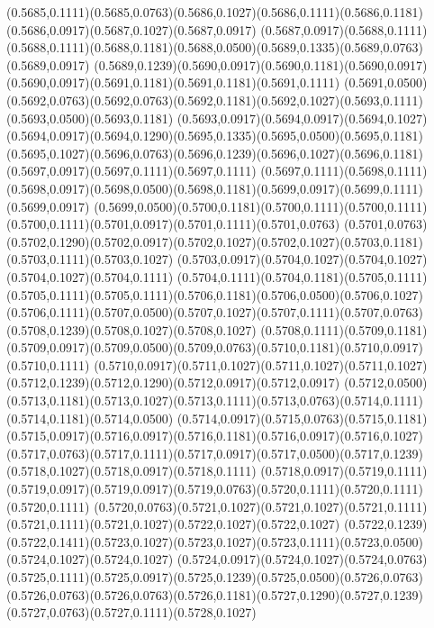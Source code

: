 (0.5685,0.1111)(0.5685,0.0763)(0.5686,0.1027)(0.5686,0.1111)(0.5686,0.1181)(0.5686,0.0917)(0.5687,0.1027)(0.5687,0.0917)
(0.5687,0.0917)(0.5688,0.1111)(0.5688,0.1111)(0.5688,0.1181)(0.5688,0.0500)(0.5689,0.1335)(0.5689,0.0763)(0.5689,0.0917)
(0.5689,0.1239)(0.5690,0.0917)(0.5690,0.1181)(0.5690,0.0917)(0.5690,0.0917)(0.5691,0.1181)(0.5691,0.1181)(0.5691,0.1111)
(0.5691,0.0500)(0.5692,0.0763)(0.5692,0.0763)(0.5692,0.1181)(0.5692,0.1027)(0.5693,0.1111)(0.5693,0.0500)(0.5693,0.1181)
(0.5693,0.0917)(0.5694,0.0917)(0.5694,0.1027)(0.5694,0.0917)(0.5694,0.1290)(0.5695,0.1335)(0.5695,0.0500)(0.5695,0.1181)
(0.5695,0.1027)(0.5696,0.0763)(0.5696,0.1239)(0.5696,0.1027)(0.5696,0.1181)(0.5697,0.0917)(0.5697,0.1111)(0.5697,0.1111)
(0.5697,0.1111)(0.5698,0.1111)(0.5698,0.0917)(0.5698,0.0500)(0.5698,0.1181)(0.5699,0.0917)(0.5699,0.1111)(0.5699,0.0917)
(0.5699,0.0500)(0.5700,0.1181)(0.5700,0.1111)(0.5700,0.1111)(0.5700,0.1111)(0.5701,0.0917)(0.5701,0.1111)(0.5701,0.0763)
(0.5701,0.0763)(0.5702,0.1290)(0.5702,0.0917)(0.5702,0.1027)(0.5702,0.1027)(0.5703,0.1181)(0.5703,0.1111)(0.5703,0.1027)
(0.5703,0.0917)(0.5704,0.1027)(0.5704,0.1027)(0.5704,0.1027)(0.5704,0.1111)
\PST@Solid(0.5704,0.1111)(0.5704,0.1181)(0.5705,0.1111)(0.5705,0.1111)(0.5705,0.1111)(0.5706,0.1181)(0.5706,0.0500)(0.5706,0.1027)
(0.5706,0.1111)(0.5707,0.0500)(0.5707,0.1027)(0.5707,0.1111)(0.5707,0.0763)(0.5708,0.1239)(0.5708,0.1027)(0.5708,0.1027)
(0.5708,0.1111)(0.5709,0.1181)(0.5709,0.0917)(0.5709,0.0500)(0.5709,0.0763)(0.5710,0.1181)(0.5710,0.0917)(0.5710,0.1111)
(0.5710,0.0917)(0.5711,0.1027)(0.5711,0.1027)(0.5711,0.1027)(0.5712,0.1239)(0.5712,0.1290)(0.5712,0.0917)(0.5712,0.0917)
(0.5712,0.0500)(0.5713,0.1181)(0.5713,0.1027)(0.5713,0.1111)(0.5713,0.0763)(0.5714,0.1111)(0.5714,0.1181)(0.5714,0.0500)
(0.5714,0.0917)(0.5715,0.0763)(0.5715,0.1181)(0.5715,0.0917)(0.5716,0.0917)(0.5716,0.1181)(0.5716,0.0917)(0.5716,0.1027)
(0.5717,0.0763)(0.5717,0.1111)(0.5717,0.0917)(0.5717,0.0500)(0.5717,0.1239)(0.5718,0.1027)(0.5718,0.0917)(0.5718,0.1111)
(0.5718,0.0917)(0.5719,0.1111)(0.5719,0.0917)(0.5719,0.0917)(0.5719,0.0763)(0.5720,0.1111)(0.5720,0.1111)(0.5720,0.1111)
(0.5720,0.0763)(0.5721,0.1027)(0.5721,0.1027)(0.5721,0.1111)(0.5721,0.1111)(0.5721,0.1027)(0.5722,0.1027)(0.5722,0.1027)
(0.5722,0.1239)(0.5722,0.1411)(0.5723,0.1027)(0.5723,0.1027)(0.5723,0.1111)(0.5723,0.0500)(0.5724,0.1027)(0.5724,0.1027)
(0.5724,0.0917)(0.5724,0.1027)(0.5724,0.0763)(0.5725,0.1111)(0.5725,0.0917)(0.5725,0.1239)(0.5725,0.0500)(0.5726,0.0763)
(0.5726,0.0763)(0.5726,0.0763)(0.5726,0.1181)(0.5727,0.1290)(0.5727,0.1239)(0.5727,0.0763)(0.5727,0.1111)(0.5728,0.1027)
